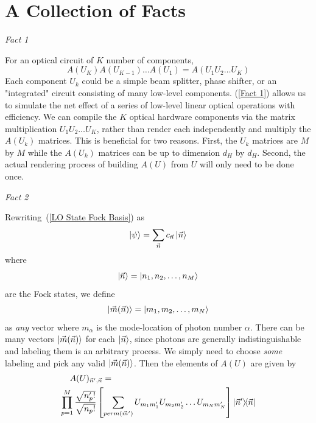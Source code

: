 \documentclass[aps,pra,twocolumn,showpacs,superscriptaddress,floatfix,10pt]{revtex4}
\begin{document}
\section{A Collection of Facts}
\label{Section of Facts}
\begin{center}\textit{Fact 1} \end{center}
For an optical circuit of $K$ number of components,
\begin{equation}
	\label{Fact 1}
\boxed{A(U_K) A(U_{K-1}) \dots A(U_1) = A(U_1 U_2 \dots U_K)}
\end{equation}
Each component $U_k$ could be a simple beam splitter, phase shifter, or an "integrated" circuit consisting of many low-level components.
(\ref{Fact 1}) allows us to simulate the net effect of a series of low-level linear optical operations with efficiency. We can compile the $K$ optical hardware components via the matrix multiplication $U_1 U_2 \dots U_K$, rather than render each independently and multiply the $A(U_k)$ matrices. This is beneficial for two reasons. First, the $U_k$ matrices are $M$ by $M$ while the $A(U_k)$ matrices can be up to dimension $d_H$ by $d_H$. Second, the actual rendering process of building $A(U)$ from $U$ will only need to be done once.
\begin{center}\textit{Fact 2} \end{center}
Rewriting~(\ref{LO State Fock Basis}) as
\begin{equation}
\label{LO State Fock Vec Basis}
\ket{\psi} = \sum_{\vec{n}} c_{\vec{n}} \ket{\vec{n}}
\end{equation}
where
\begin{equation}
\ket{\vec{n}} = \ket{n_1,n_2,\dots,n_M}
\end{equation}
are the Fock states, we define
\begin{equation}
\label{m definition}
\ket{\vec{m}(\vec{n})} = \ket{m_1,m_2,\dots,m_N}
\end{equation}
as \textit{any} vector where $m_\alpha$ is the mode-location of photon number $\alpha$. There can be many vectors $\ket{\vec{m}(\vec{n})}$ for each $\ket{\vec{n}}$, since photons are generally indistinguishable and labeling them is an arbitrary process. We simply need to choose \textit{some} labeling and pick any valid $\ket{\vec{m}(\vec{n})}$. Then the elements of $A(U)$ are given by
\begin{eqnarray}
\label{Fact 2}
A(U)_{\vec{n}^\prime,\vec{n}} = \quad \quad \quad \quad \quad \quad \quad \quad \quad \quad \quad \quad \quad \quad \quad \quad \quad \\ \small \nonumber \prod_{p=1}^{M} \frac{\sqrt{n_p^\prime !}}{\sqrt{n_p !}} \left[\sum_{perm(\vec{m}^\prime)} U_{m_1 m_1^\prime} U_{m_2 m_2^\prime} \dots U_{m_N m_N^\prime} \right] \outerproduct{\vec{n}^\prime}{\vec{n}} 
\end{eqnarray}
\end{document}
